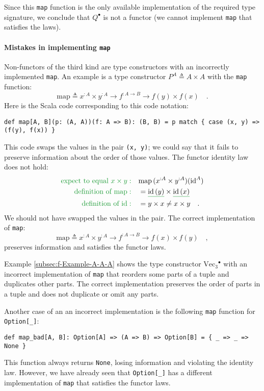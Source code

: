 Since this \lstinline!map! function is the only available implementation
of the required type signature, we conclude that $Q^{\bullet}$ is
not a functor (we cannot implement \lstinline!map! that satisfies
the laws).

\paragraph{Mistakes in implementing \texttt{map}}

Non-functors of the third kind are type constructors with an incorrectly
implemented \lstinline!map!. An example is a type constructor $P^{A}\triangleq A\times A$
with the \lstinline!map! function:
\[
\text{map}\triangleq x^{:A}\times y^{:A}\rightarrow f^{:A\rightarrow B}\rightarrow f(y)\times f(x)\quad.
\]
Here is the Scala code corresponding to this code notation:
\begin{lstlisting}
def map[A, B](p: (A, A))(f: A => B): (B, B) = p match { case (x, y) => (f(y), f(x)) }
\end{lstlisting}
This code swaps the values in the pair \lstinline!(x, y)!; we could
say that it fails to preserve information about the order of those
values. The functor identity law does not hold:
\begin{align*}
{\color{greenunder}\text{expect to equal }x\times y:}\quad & \text{map}\,(x^{:A}\times y^{:A})(\text{id}^{A})\\
{\color{greenunder}\text{definition of }\text{map}:}\quad & =\gunderline{\text{id}\,(y)}\times\gunderline{\text{id}\,(x)}\\
{\color{greenunder}\text{definition of }\text{id}:}\quad & =y\times x\neq x\times y\quad.
\end{align*}
We should not have swapped the values in the pair. The correct implementation
of \lstinline!map!:
\[
\text{map}\triangleq x^{:A}\times y^{:A}\rightarrow f^{:A\rightarrow B}\rightarrow f(x)\times f(y)\quad,
\]
preserves information and satisfies the functor laws.

Example \ref{subsec:f-Example-A-A-A} shows the type constructor $\text{Vec}_{3}{}^{\bullet}$
with an incorrect implementation of \lstinline!map! that reorders
some parts of a tuple and duplicates other parts. The correct implementation
preserves the order of parts in a tuple and does not duplicate or
omit any parts.

Another case of an an incorrect implementation is the following \lstinline!map!
function for \lstinline!Option[_]!:
\begin{lstlisting}
def map_bad[A, B]: Option[A] => (A => B) => Option[B] = { _ => _ => None }
\end{lstlisting}
This function always returns \lstinline!None!, losing information
and violating the identity law. However, we have already seen that
\lstinline!Option[_]! has a different implementation of \lstinline!map!
that satisfies the functor laws.

